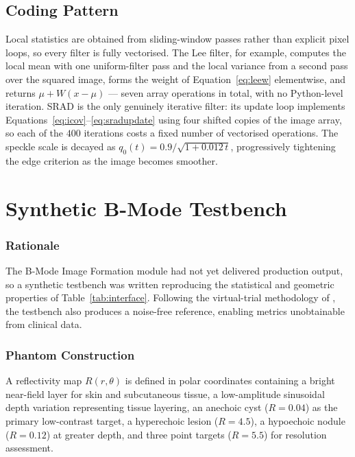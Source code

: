 \documentclass[12pt,a4paper,oneside]{report}
\begin{document}
\subsection{Coding Pattern}

Local statistics are obtained from sliding-window passes rather than explicit
pixel loops, so every filter is fully vectorised. The Lee filter, for example,
computes the local mean with one uniform-filter pass and the local variance from a
second pass over the squared image, forms the weight of
Equation~\eqref{eq:leew} elementwise, and returns
$\mu + W(x-\mu)$ --- seven array operations in total, with no Python-level
iteration. SRAD is the only genuinely iterative filter: its update loop implements
Equations~\eqref{eq:icov}--\eqref{eq:sradupdate} using four shifted copies of the
image array, so each of the $400$ iterations costs a fixed number of vectorised
operations. The speckle scale is decayed as $q_0(t)=0.9/\sqrt{1+0.012\,t}$,
progressively tightening the edge criterion as the image becomes smoother.

\section{Synthetic B-Mode Testbench}

\subsubsection{Rationale}

The B-Mode Image Formation module had not yet delivered production output, so a
synthetic testbench was written reproducing the statistical and geometric
properties of Table~\ref{tab:interface}. Following the virtual-trial methodology
of \cite{abadi2020vct}, the testbench also produces a noise-free reference,
enabling metrics unobtainable from clinical data.

\subsubsection{Phantom Construction}

A reflectivity map $R(r,\theta)$ is defined in polar coordinates containing a
bright near-field layer for skin and subcutaneous tissue, a low-amplitude
sinusoidal depth variation representing tissue layering, an anechoic cyst
($R=0.04$) as the primary low-contrast target, a hyperechoic lesion ($R=4.5$), a
hypoechoic nodule ($R=0.12$) at greater depth, and three point targets ($R=5.5$)
for resolution assessment.
\end{document}
